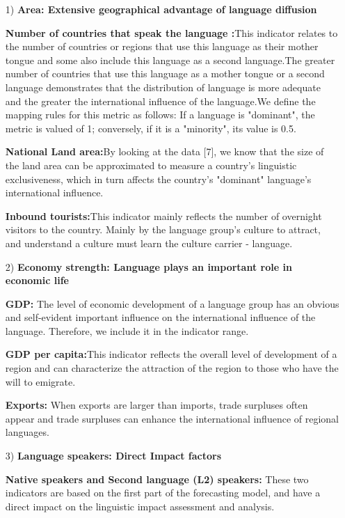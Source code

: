 \begin{enumerate}
	\item[1)] \textbf{Area: Extensive geographical advantage of language diffusion}
	\par \textbf{Number of countries that speak the language :}This indicator relates to the number of countries or regions that use this language as their mother tongue and some also include this language as a second language.The greater number of countries that use this language as a mother tongue or a second language demonstrates that the distribution of language is more adequate and the greater the international influence of the language.We define the mapping rules for this metric as follows: If a language is "dominant", the metric is valued of 1; conversely, if it is a "minority", its value is 0.5.
	\par \textbf{National Land area:}By looking at the data [7], we know that the size of the land area can be approximated to measure a country's linguistic exclusiveness, which in turn affects the country's "dominant" language's international influence.
	\par \textbf{Inbound tourists:}This indicator mainly reflects the number of overnight visitors to the country. Mainly by the language group's culture to attract, and understand a culture must learn the culture carrier - language.
	
	\item[2)] \textbf{Economy strength: Language plays an important role in economic life}
	\par \textbf{GDP: }The level of economic development of a language group has an obvious and self-evident important influence on the international influence of the language. Therefore, we include it in the indicator range.
	\par \textbf{GDP per capita:}This indicator reflects the overall level of development of a region and can characterize the attraction of the region to those who have the will to emigrate.
	\par \textbf{Exports: }When exports are larger than imports, trade surpluses often appear and trade surpluses can enhance the international influence of regional languages.
	
	\item[3)] \textbf{Language speakers: Direct Impact factors}
	\par \textbf{Native speakers and Second language (L2) speakers:} These two indicators are based on the first part of the forecasting model, and have a direct impact on the linguistic impact assessment and analysis.
	

\end{enumerate}
